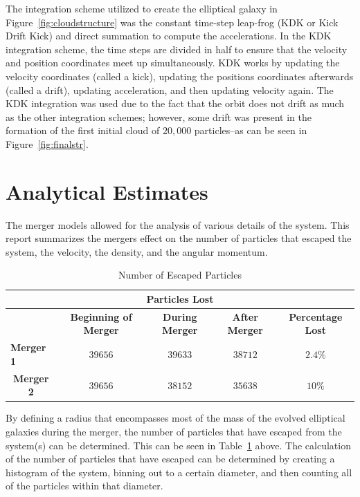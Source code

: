 \documentclass[12pt]{report}
\begin{document}
The integration scheme utilized to create the elliptical galaxy in Figure~\ref{fig:cloudstructure} was the constant time-step leap-frog (KDK or Kick Drift Kick) and direct summation to compute the accelerations. In the KDK integration scheme, the time steps are divided in half to ensure that the velocity and position coordinates meet up simultaneously. KDK works by updating the velocity coordinates (called a kick), updating the positions coordinates afterwards (called a drift), updating acceleration, and then updating velocity again. The KDK integration was used due to the fact that the orbit does not drift as much as the other integration schemes; however, some drift was present in the formation of the first initial cloud of $20,000$ particles--as can be seen in Figure~\ref{fig:finalstr}.





\section*{Analytical Estimates} \label{sec:analytical}

The merger models allowed for the analysis of various details of the system. This report summarizes the mergers effect on the number of particles that escaped the system, the velocity, the density, and the angular momentum.

\begin{table}[H]
\begin{tabular}{@{}lcccc@{}}
\toprule
\multicolumn{5}{c}{\textbf{Particles Lost}} \\ \midrule
\multicolumn{1}{l|}{} & \multicolumn{1}{c|}{\textbf{Beginning of Merger}} & \multicolumn{1}{c|}{\textbf{During Merger}} & \multicolumn{1}{c|}{\textbf{After Merger}} & \multicolumn{1}{c|}{\textbf{Percentage Lost}} \\ \midrule
\multicolumn{1}{l|}{\textbf{Merger 1}} & $39656$ & $39633$ & $38712$ & \multicolumn{1}{c|}{$2.4\%$} \\ \midrule
\multicolumn{1}{c|}{\textbf{Merger 2}} & $39656$ & $38152$ & $35638$ & \multicolumn{1}{c|}{$10\%$} \\ \bottomrule
\end{tabular}
\caption{Number of Escaped Particles}
\label{tab:escapedparticles}
\end{table}


By defining a radius that encompasses most of the mass of the evolved elliptical galaxies during the merger, the number of particles that have escaped from the system(s) can be determined. This can be seen in Table~\ref{tab:escapedparticles} above. The calculation of the number of particles that have escaped can be determined by creating a histogram of the system, binning out to a certain diameter, and then counting all of the particles within that diameter. 
\end{document}
